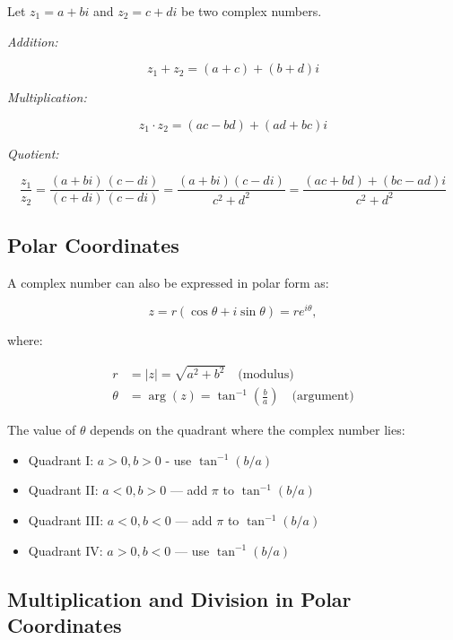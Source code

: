 Let \( z_1 = a + bi \) and \( z_2 = c + di \) be two complex numbers.

\emph{Addition:}

\[ 
	z_1 + z_2 = (a + c) + (b + d)i
\]

\emph{Multiplication:}
	      
\[
	z_1 \cdot z_2 = (ac - bd) + (ad + bc)i
\]

\emph{Quotient:}
	      
\[
	\frac{z_1}{z_2} = \frac{(a + bi)}{(c + di)} \frac{(c - di)}{(c - di)} = \frac{(a + bi)(c - di)}
	{c^2 + d^2} = \frac{(ac + bd) + (bc - ad)i}{c^2 + d^2}
\]

\subsection{Polar Coordinates}

A complex number can also be expressed in polar form as:

\[
	z = r(\cos \theta + i \sin \theta) = re^{i\theta},
\]

where:

\begin{align*}
	r      & = |z| = \sqrt{a^2 + b^2} \quad \text{(modulus)}                       \\
	\theta & = \arg(z) = \tan^{-1}\left(\frac{b}{a}\right) \quad \text{(argument)}
\end{align*}

The value of \( \theta \) depends on the quadrant where the complex number lies:

\begin{itemize}
	
	\item Quadrant I: \( a > 0, b > 0 \) - use \( \tan^{-1}(b/a) \)
	
	\item Quadrant II: \( a < 0, b > 0 \) — add \( \pi \) to \( \tan^{-1}(b/a) \)
	
	\item Quadrant III: \( a < 0, b < 0 \) — add \( \pi \) to \( \tan^{-1}(b/a) \)
	
	\item Quadrant IV: \( a > 0, b < 0 \) — use \( \tan^{-1}(b/a) \)

\end{itemize}

\subsection{Multiplication and Division in Polar Coordinates}

